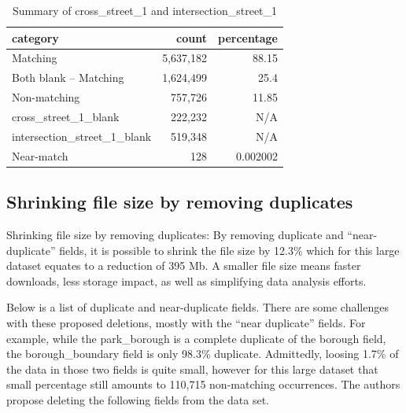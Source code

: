 \documentclass[linenumber]{jdsart}
\begin{document}
\begin{table}[tbp]
    \centering
    \caption{Summary of cross\_street\_1 and intersection\_street\_1}
    \label{tab:summary1}
	    \begin{tabular}{l r r}
	        \toprule
	        \textbf{category} & \textbf{count} & \textbf{percentage} \\
	        \midrule
	        Matching                    & 5,637,182 & 88.15     \\
	        Both blank -- Matching      & 1,624,499 & 25.4      \\
	        Non-matching                &   757,726 & 11.85     \\
	        cross\_street\_1\_blank     &   222,232 & N/A       \\
	        intersection\_street\_1\_blank &   519,348 & N/A       \\
	        Near-match                  &       128 & 0.002002  \\
	        \bottomrule
	    \end{tabular}
\end{table}


\subsection{Shrinking file size by removing duplicates}
 \label{sec:filesize}
Shrinking file size by removing duplicates: By removing duplicate 
and ``near-duplicate'' fields, it is possible to 
shrink the file size by 12.3\% which for this large dataset equates to a 
reduction of 395 Mb. A smaller file size means faster downloads, 
less storage impact, as well as simplifying data analysis efforts.  
 
 
Below is a list of duplicate and near-duplicate fields. There are 
some challenges with these proposed deletions, mostly with 
the ``near duplicate'' fields.  For example, while the park\_borough is 
a complete duplicate of the borough field, the 
borough\_boundary field is only 98.3\% duplicate. Admittedly, 
loosing 1.7\% of the data in those two fields is quite small, however
for this large dataset that small percentage still amounts 
to 110,715 non-matching occurrences. The authors  propose 
deleting the following fields from the data set.
 
\end{document}
